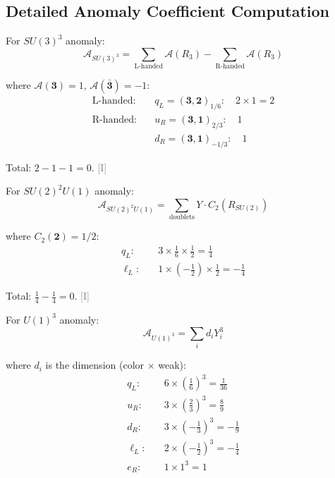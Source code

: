 \documentclass[11pt,a4paper]{article}
\newcommand{\tagI}{\textcolor{gray}{[I]}}
\begin{document}
\subsection{Detailed Anomaly Coefficient Computation}

For $SU(3)^3$ anomaly:
\begin{equation}
\label{eq:su3-3-detail}
\mathcal{A}_{SU(3)^3} = \sum_{\text{L-handed}} \mathcal{A}(R_3) - \sum_{\text{R-handed}} \mathcal{A}(R_3)
\end{equation}

where $\mathcal{A}(\mathbf{3}) = 1$, $\mathcal{A}(\bar{\mathbf{3}}) = -1$:
\begin{align}
\label{eq:su3-3-L}
\text{L-handed:} \quad & q_L = (\mathbf{3}, \mathbf{2})_{1/6}: \quad 2 \times 1 = 2 \\
\label{eq:su3-3-R}
\text{R-handed:} \quad & u_R = (\mathbf{3}, \mathbf{1})_{2/3}: \quad 1 \\
\label{eq:su3-3-R2}
& d_R = (\mathbf{3}, \mathbf{1})_{-1/3}: \quad 1
\end{align}

Total: $2 - 1 - 1 = 0$. \tagI

For $SU(2)^2 U(1)$ anomaly:
\begin{equation}
\label{eq:su2-2-u1-formula}
\mathcal{A}_{SU(2)^2 U(1)} = \sum_{\text{doublets}} Y \cdot C_2(R_{SU(2)})
\end{equation}

where $C_2(\mathbf{2}) = 1/2$:
\begin{align}
\label{eq:su2-2-u1-qL}
q_L: \quad & 3 \times \frac{1}{6} \times \frac{1}{2} = \frac{1}{4} \\
\label{eq:su2-2-u1-lL}
\ell_L: \quad & 1 \times (-\frac{1}{2}) \times \frac{1}{2} = -\frac{1}{4}
\end{align}

Total: $\frac{1}{4} - \frac{1}{4} = 0$. \tagI

For $U(1)^3$ anomaly:
\begin{equation}
\label{eq:u1-3-formula}
\mathcal{A}_{U(1)^3} = \sum_i d_i Y_i^3
\end{equation}

where $d_i$ is the dimension (color $\times$ weak):
\begin{align}
\label{eq:u1-3-qL}
q_L: \quad & 6 \times (\frac{1}{6})^3 = \frac{1}{36} \\
\label{eq:u1-3-uR}
u_R: \quad & 3 \times (\frac{2}{3})^3 = \frac{8}{9} \\
\label{eq:u1-3-dR}
d_R: \quad & 3 \times (-\frac{1}{3})^3 = -\frac{1}{9} \\
\label{eq:u1-3-lL}
\ell_L: \quad & 2 \times (-\frac{1}{2})^3 = -\frac{1}{4} \\
\label{eq:u1-3-eR}
e_R: \quad & 1 \times 1^3 = 1
\end{align}
\end{document}
